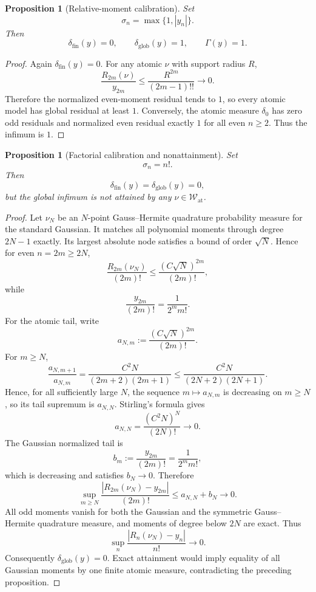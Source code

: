 \documentclass[11pt]{article}
\newtheorem{proposition}[definition]{Proposition}
\newcommand{\W}{\mathcal W}
\begin{document}
\begin{proposition}[Relative-moment calibration]
Set
\[
\sigma_n=\max\{1,|y_n|\}.
\]
Then
\[
\delta_{\mathrm{fin}}(y)=0,
\qquad
\delta_{\mathrm{glob}}(y)=1,
\qquad
\Gamma(y)=1.
\]
\end{proposition}

\begin{proof}
Again $\delta_{\mathrm{fin}}(y)=0$. For any atomic $\nu$ with support radius
$R$,
\[
\frac{R_{2m}(\nu)}{y_{2m}}
\le
\frac{R^{2m}}{(2m-1)!!}
\to0.
\]
Therefore the normalized even-moment residual tends to $1$, so every atomic
model has global residual at least $1$. Conversely, the atomic measure
$\delta_0$ has zero odd residuals and normalized even residual exactly $1$ for
all even $n\ge2$. Thus the infimum is $1$.
\end{proof}

\begin{proposition}[Factorial calibration and nonattainment]
Set
\[
\sigma_n=n!.
\]
Then
\[
\delta_{\mathrm{fin}}(y)
=
\delta_{\mathrm{glob}}(y)
=
0,
\]
but the global infimum is not attained by any
$\nu\in\W_{\mathrm{at}}$.
\end{proposition}

\begin{proof}
Let $\nu_N$ be an $N$-point Gauss--Hermite quadrature probability measure for
the standard Gaussian. It matches all polynomial moments through degree
$2N-1$ exactly. Its largest absolute node satisfies a bound of order
$\sqrt N$. Hence for even $n=2m\ge2N$,
\[
\frac{R_{2m}(\nu_N)}{(2m)!}
\le
\frac{(C\sqrt N)^{2m}}{(2m)!},
\]
while
\[
\frac{y_{2m}}{(2m)!}
=
\frac{1}{2^m m!}.
\]
For the atomic tail, write
\[
a_{N,m}:=
\frac{(C\sqrt N)^{2m}}{(2m)!}.
\]
For $m\ge N$,
\[
\frac{a_{N,m+1}}{a_{N,m}}
=
\frac{C^2N}{(2m+2)(2m+1)}
\le
\frac{C^2N}{(2N+2)(2N+1)}.
\]
Hence, for all sufficiently large $N$, the sequence $m\mapsto a_{N,m}$ is
decreasing on $m\ge N$, so its tail supremum is $a_{N,N}$. Stirling's
formula gives
\[
a_{N,N}=
\frac{(C^2N)^N}{(2N)!}
\longrightarrow0.
\]
The Gaussian normalized tail is
\[
b_m:=\frac{y_{2m}}{(2m)!}=
\frac{1}{2^m m!},
\]
which is decreasing and satisfies $b_N\to0$. Therefore
\[
\sup_{m\ge N}
\frac{|R_{2m}(\nu_N)-y_{2m}|}{(2m)!}
\le a_{N,N}+b_N\longrightarrow0.
\]
All odd moments vanish for both the Gaussian and the symmetric Gauss--Hermite
quadrature measure, and moments of degree below $2N$ are exact. Thus
\[
\sup_n\frac{|R_n(\nu_N)-y_n|}{n!}\to0.
\]
Consequently $\delta_{\mathrm{glob}}(y)=0$. Exact attainment would imply
equality of all Gaussian moments by one finite atomic measure, contradicting
the preceding proposition.
\end{proof}
\end{document}

